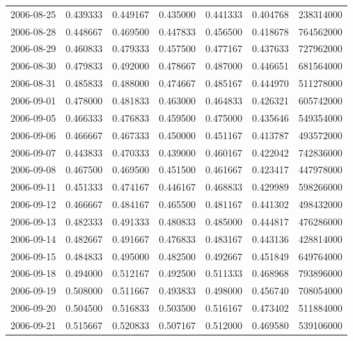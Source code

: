 \begin{tabular}{lrrrrrr}
2006-08-25 &    0.439333 &    0.449167 &    0.435000 &    0.441333 &    0.404768 &   238314000 \\
2006-08-28 &    0.448667 &    0.469500 &    0.447833 &    0.456500 &    0.418678 &   764562000 \\
2006-08-29 &    0.460833 &    0.479333 &    0.457500 &    0.477167 &    0.437633 &   727962000 \\
2006-08-30 &    0.479833 &    0.492000 &    0.478667 &    0.487000 &    0.446651 &   681564000 \\
2006-08-31 &    0.485833 &    0.488000 &    0.474667 &    0.485167 &    0.444970 &   511278000 \\
2006-09-01 &    0.478000 &    0.481833 &    0.463000 &    0.464833 &    0.426321 &   605742000 \\
2006-09-05 &    0.466333 &    0.476833 &    0.459500 &    0.475000 &    0.435646 &   549354000 \\
2006-09-06 &    0.466667 &    0.467333 &    0.450000 &    0.451167 &    0.413787 &   493572000 \\
2006-09-07 &    0.443833 &    0.470333 &    0.439000 &    0.460167 &    0.422042 &   742836000 \\
2006-09-08 &    0.467500 &    0.469500 &    0.451500 &    0.461667 &    0.423417 &   447978000 \\
2006-09-11 &    0.451333 &    0.474167 &    0.446167 &    0.468833 &    0.429989 &   598266000 \\
2006-09-12 &    0.466667 &    0.484167 &    0.465500 &    0.481167 &    0.441302 &   498432000 \\
2006-09-13 &    0.482333 &    0.491333 &    0.480833 &    0.485000 &    0.444817 &   476286000 \\
2006-09-14 &    0.482667 &    0.491667 &    0.476833 &    0.483167 &    0.443136 &   428814000 \\
2006-09-15 &    0.484833 &    0.495000 &    0.482500 &    0.492667 &    0.451849 &   649764000 \\
2006-09-18 &    0.494000 &    0.512167 &    0.492500 &    0.511333 &    0.468968 &   793896000 \\
2006-09-19 &    0.508000 &    0.511667 &    0.493833 &    0.498000 &    0.456740 &   708054000 \\
2006-09-20 &    0.504500 &    0.516833 &    0.503500 &    0.516167 &    0.473402 &   511884000 \\
2006-09-21 &    0.515667 &    0.520833 &    0.507167 &    0.512000 &    0.469580 &   539106000 \\

\end{tabular}
